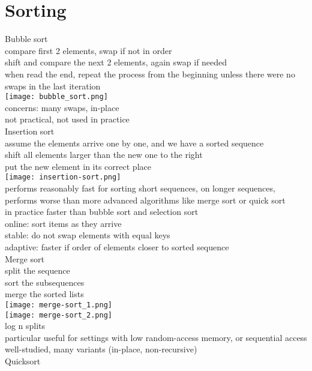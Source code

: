 \section{Sorting}
\scriptsize{Bubble sort}\\ 
{\tiny compare first 2 elements, swap if not in order \\
shift and compare the next 2 elements, again swap if needed \\
when read the end, repeat the process from the beginning unless there were no swaps in the last iteration \\
\texttt{[image: bubble\_sort.png]}\\
concerns: many swaps, in-place\\
not practical, not used in practice
}\\
\scriptsize{Insertion sort}\\
{\tiny assume the elements arrive one by one, and we have a sorted sequence \\
shift all elements larger than the new one to the right\\
put the new element in its correct place\\
\texttt{[image: insertion-sort.png]}\\
performs reasonably fast for sorting short sequences, on longer sequences, performs worse than more advanced algorithms like merge sort or quick sort\\
in practice faster than bubble sort and selection sort\\
online: sort items as they arrive\\
stable: do not swap elements with equal keys\\
adaptive: faster if order of elements closer to sorted sequence
}\\
\scriptsize{Merge sort}\\
{\tiny split the sequence \\
sort the subsequences\\
merge the sorted lists\\
\texttt{[image: merge-sort\_1.png]}\\
\texttt{[image: merge-sort\_2.png]}\\
log n splits\\
particular useful for settings with low random-access memory, or sequential access\\
well-studied, many variants (in-place, non-recursive)
}\\
\scriptsize{Quicksort}\\
